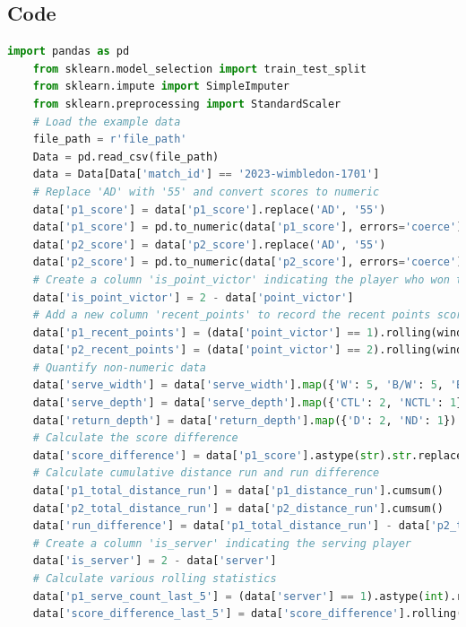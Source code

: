 \documentclass[UTF8]{ctexart} %
\begin{document}
\subsection*{Code}
\begin{lstlisting}[language=Python, caption=Code of Data Cleaning and Logistic Regression Model]
    import pandas as pd
    from sklearn.model_selection import train_test_split
    from sklearn.impute import SimpleImputer
    from sklearn.preprocessing import StandardScaler
    # Load the example data
    file_path = r'file_path'
    Data = pd.read_csv(file_path)
    data = Data[Data['match_id'] == '2023-wimbledon-1701']
    # Replace 'AD' with '55' and convert scores to numeric
    data['p1_score'] = data['p1_score'].replace('AD', '55')
    data['p1_score'] = pd.to_numeric(data['p1_score'], errors='coerce')
    data['p2_score'] = data['p2_score'].replace('AD', '55')
    data['p2_score'] = pd.to_numeric(data['p2_score'], errors='coerce')
    # Create a column 'is_point_victor' indicating the player who won the point
    data['is_point_victor'] = 2 - data['point_victor']
    # Add a new column 'recent_points' to record the recent points scored by player 1 and player 2
    data['p1_recent_points'] = (data['point_victor'] == 1).rolling(window=5, min_periods=0).sum() - (data['point_victor'] == 2).rolling(window=5, min_periods=0).sum()
    data['p2_recent_points'] = (data['point_victor'] == 2).rolling(window=5, min_periods=0).sum() - (data['point_victor'] == 1).rolling(window=5, min_periods=0).sum()
    # Quantify non-numeric data
    data['serve_width'] = data['serve_width'].map({'W': 5, 'B/W': 5, 'B': 3, 'B/C': 2, 'C': 1})
    data['serve_depth'] = data['serve_depth'].map({'CTL': 2, 'NCTL': 1})
    data['return_depth'] = data['return_depth'].map({'D': 2, 'ND': 1})
    # Calculate the score difference
    data['score_difference'] = data['p1_score'].astype(str).str.replace('AD', '50').astype(int) - data['p2_score'].astype(str).str.replace('AD', '50').astype(int)
    # Calculate cumulative distance run and run difference
    data['p1_total_distance_run'] = data['p1_distance_run'].cumsum()
    data['p2_total_distance_run'] = data['p2_distance_run'].cumsum()
    data['run_difference'] = data['p1_total_distance_run'] - data['p2_total_distance_run']
    # Create a column 'is_server' indicating the serving player
    data['is_server'] = 2 - data['server']
    # Calculate various rolling statistics
    data['p1_serve_count_last_5'] = (data['server'] == 1).astype(int).rolling(window=5, min_periods=1).sum()
    data['score_difference_last_5'] = data['score_difference'].rolling(window=5, min_periods=1).sum()

\end{lstlisting}
\end{document}
